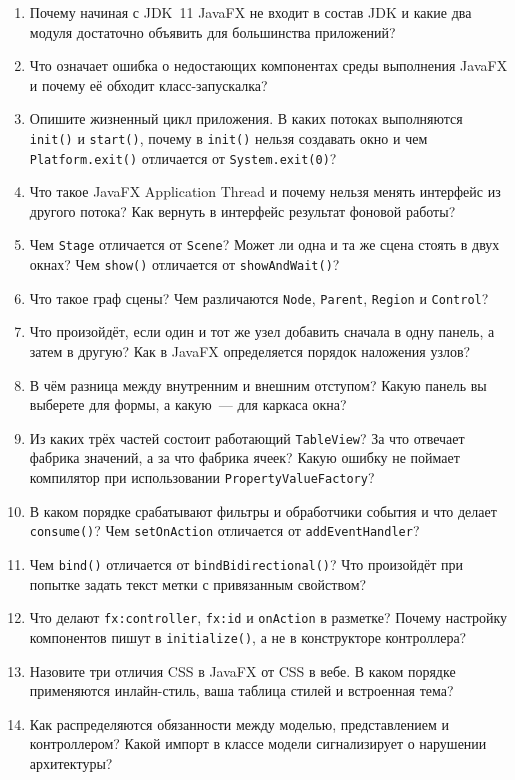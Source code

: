 \begin{enumerate}
\item Почему начиная с JDK~11 JavaFX не входит в состав JDK и какие два модуля
      достаточно объявить для большинства приложений?
\item Что означает ошибка о недостающих компонентах среды выполнения JavaFX и
      почему её обходит класс-запускалка?
\item Опишите жизненный цикл приложения. В каких потоках выполняются
      \texttt{init()} и \texttt{start()}, почему в \texttt{init()} нельзя
      создавать окно и чем \texttt{Platform.exit()} отличается от
      \texttt{System.exit(0)}?
\item Что такое JavaFX Application Thread и почему нельзя менять интерфейс из
      другого потока? Как вернуть в интерфейс результат фоновой работы?
\item Чем \texttt{Stage} отличается от \texttt{Scene}? Может ли одна и та же
      сцена стоять в двух окнах? Чем \texttt{show()} отличается от
      \texttt{showAndWait()}?
\item Что такое граф сцены? Чем различаются \texttt{Node}, \texttt{Parent},
      \texttt{Region} и \texttt{Control}?
\item Что произойдёт, если один и тот же узел добавить сначала в одну панель, а
      затем в другую? Как в JavaFX определяется порядок наложения узлов?
\item В чём разница между внутренним и внешним отступом? Какую панель вы
      выберете для формы, а какую~--- для каркаса окна?
\item Из каких трёх частей состоит работающий \texttt{TableView}? За что
      отвечает фабрика значений, а за что фабрика ячеек? Какую ошибку не
      поймает компилятор при использовании \texttt{PropertyValueFactory}?
\item В каком порядке срабатывают фильтры и обработчики события и что делает
      \texttt{consume()}? Чем \texttt{setOnAction} отличается от
      \texttt{addEventHandler}?
\item Чем \texttt{bind()} отличается от \texttt{bindBidirectional()}? Что
      произойдёт при попытке задать текст метки с привязанным свойством?
\item Что делают \texttt{fx:controller}, \texttt{fx:id} и \texttt{onAction} в
      разметке? Почему настройку компонентов пишут в \texttt{initialize()}, а не
      в конструкторе контроллера?
\item Назовите три отличия CSS в JavaFX от CSS в вебе. В каком порядке
      применяются инлайн-стиль, ваша таблица стилей и встроенная тема?
\item Как распределяются обязанности между моделью, представлением и
      контроллером? Какой импорт в классе модели сигнализирует о нарушении
      архитектуры?
\end{enumerate}

